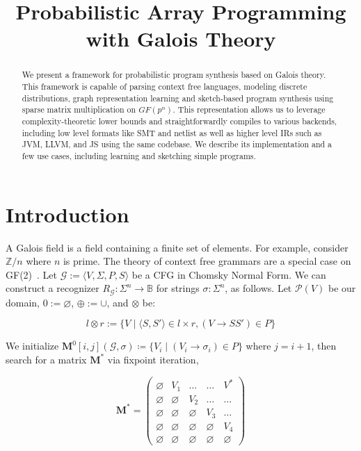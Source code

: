 \documentclass[sigplan,10pt,review,anonymous]{acmart}
\begin{document}
\title{Probabilistic Array Programming with Galois Theory}
\begin{abstract}
We present a framework for probabilistic program synthesis based on Galois theory. This framework is capable of parsing context free languages, modeling discrete distributions, graph representation learning and sketch-based program synthesis using sparse matrix multiplication on $GF(p^n)$. This representation allows us to leverage complexity-theoretic lower bounds and straightforwardly compiles to various backends, including low level formats like SMT and netlist as well as higher level IRs such as JVM, LLVM, and JS using the same codebase. We describe its implementation and a few use cases, including learning and sketching simple programs.
\end{abstract}
\maketitle

\section{Introduction}

A Galois field is a field containing a finite set of elements. For example, consider $\mathbb{Z}/n$ where $n$ is prime. The theory of context free grammars are a special case on GF(2)~\citep{jansson2016certified, bakinova2020formal}. Let $\mathcal{G} := \langle V, \Sigma, P, S\rangle$ be a CFG in Chomsky Normal Form. We can construct a recognizer $R_\mathcal{G}: \Sigma^n \rightarrow \mathbb{B}$ for strings $\sigma: \Sigma^n$, as follows. Let $\mathcal P(V)$ be our domain, $0 := \varnothing$, $\oplus := \cup$, and $\otimes$ be:

\[
l \otimes r := \{V \mid \langle S, S'\rangle \in l \times r, (V\rightarrow SS') \in P\}
\]

We initialize $\mathbf{M}^0[i, j](\mathcal{G}, \sigma) \coloneqq \{V_i \mid (V_i \rightarrow \sigma_i) \in P\}$ where $j = i+1$, then search for a matrix $\mathbf{M}^*$ via fixpoint iteration,

\[
\mathbf{M}^* = \begin{pmatrix}
            \varnothing & V_1 & \ldots & \ldots & V^* \\
            \varnothing & \varnothing & V_2 & \ldots & \ldots \\
            \varnothing & \varnothing & \varnothing & V_3 & \ldots \\
            \varnothing & \varnothing & \varnothing & \varnothing & V_4 \\
            \varnothing & \varnothing & \varnothing & \varnothing & \varnothing
\end{pmatrix}
\]
\end{document}
